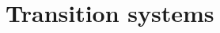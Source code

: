 \documentclass{amsart}
\DeclareMathOperator{\ap}{AP}
\DeclareMathOperator{\true}{\mathtt{true}}
\theoremstyle{plain}
\theoremstyle{definition}
\newtheorem{defn}{Definition}
\theoremstyle{definition}
\begin{document}






\section{Transition systems}\label{sec:ts}
\end{document}
